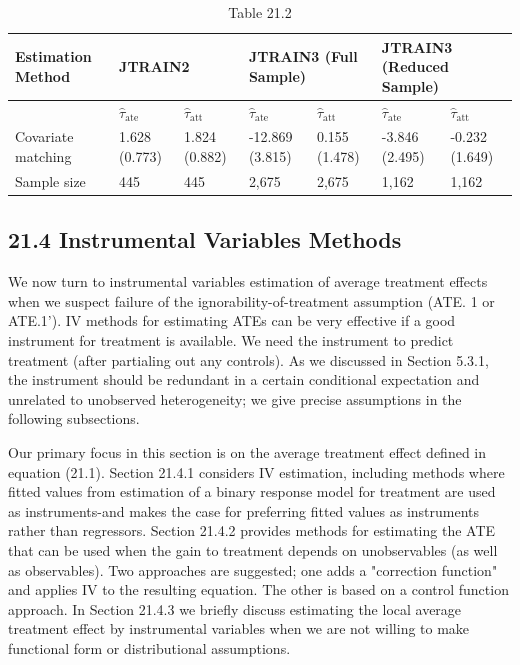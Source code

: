 \documentclass[10pt]{article}
\begin{document}
\begin{table}[h]
\begin{center}
\captionsetup{labelformat=empty}
\caption{Table 21.2}
\begin{tabular}{|l|l|l|l|l|l|l|}
\hline
\multirow[b]{2}{*}{Estimation Method} & \multicolumn{2}{|l|}{JTRAIN2} & \multicolumn{2}{|l|}{JTRAIN3 (Full Sample)} & \multicolumn{2}{|l|}{JTRAIN3 (Reduced Sample)} \\
\hline
 & $\hat{\tau}_{\text {ate }}$ & $\hat{\tau}_{\text {att }}$ & $\hat{\tau}_{\text {ate }}$ & $\hat{\tau}_{\text {att }}$ & $\hat{\tau}_{\text {ate }}$ & $\hat{\tau}_{\text {att }}$ \\
\hline
Covariate matching & 1.628 (0.773) & 1.824 (0.882) & -12.869 (3.815) & 0.155 (1.478) & -3.846 (2.495) & -0.232 (1.649) \\
\hline
Sample size & 445 & 445 & 2,675 & 2,675 & 1,162 & 1,162 \\
\hline
\end{tabular}
\end{center}
\end{table}

\subsection*{21.4 Instrumental Variables Methods}
We now turn to instrumental variables estimation of average treatment effects when we suspect failure of the ignorability-of-treatment assumption (ATE. 1 or ATE.1'). IV methods for estimating ATEs can be very effective if a good instrument for treatment is available. We need the instrument to predict treatment (after partialing out any controls). As we discussed in Section 5.3.1, the instrument should be redundant in a certain conditional expectation and unrelated to unobserved heterogeneity; we give precise assumptions in the following subsections.

Our primary focus in this section is on the average treatment effect defined in equation (21.1). Section 21.4.1 considers IV estimation, including methods where fitted values from estimation of a binary response model for treatment are used as instruments-and makes the case for preferring fitted values as instruments rather than regressors. Section 21.4.2 provides methods for estimating the ATE that can be used when the gain to treatment depends on unobservables (as well as observables). Two approaches are suggested; one adds a "correction function" and applies IV to the resulting equation. The other is based on a control function approach. In Section 21.4.3 we briefly discuss estimating the local average treatment effect by instrumental variables when we are not willing to make functional form or distributional assumptions.
\end{document}
